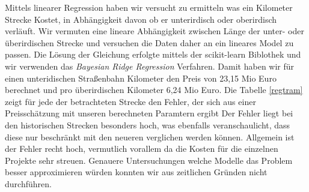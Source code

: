 Mittels linearer Regression haben wir versucht zu ermitteln was ein Kilometer Strecke Kostet, in Abhängigkeit davon ob er unterirdisch oder oberirdisch verläuft. Wir vermuten eine lineare Abhängigkeit zwischen Länge der unter- oder überirdischen Strecke und versuchen die Daten daher an ein lineares Model zu passen. Die Lösung der Gleichung erfolgte mittels der scikit-learn Biblothek und wir verwenden das \emph{ Bayesian Ridge Regression} Verfahren. Damit haben wir für einen unteridischen Straßenbahn Kilometer den Preis von 23,15 Mio Euro berechnet und pro überirdischen Kilometer 6,24 Mio Euro. Die Tabelle \ref{regtram} zeigt für jede der betrachteten Strecke den Fehler, der sich aus einer Preisschätzung mit unseren berechneten Paramtern ergibt Der Fehler liegt bei den historischen Strecken besonders hoch, was ebenfalls veranschaulicht, dass diese nur beschränkt mit den neueren verglichen werden können. Allgemein ist der Fehler recht hoch, vermutlich vorallem da die Kosten für die einzelnen Projekte sehr streuen.  Genauere Untersuchungen welche Modelle das Problem besser approximieren würden konnten wir aus zeitlichen Gründen nicht durchführen.
